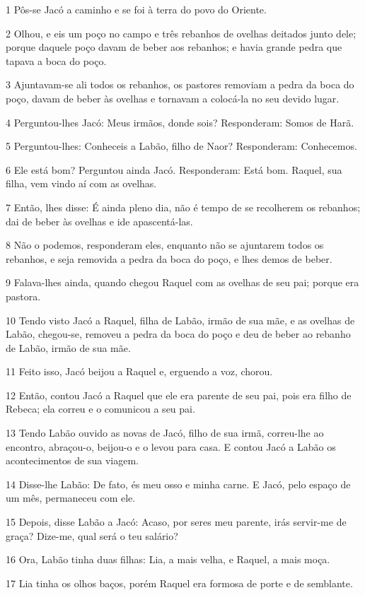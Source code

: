 \par 1 Pôs-se Jacó a caminho e se foi à terra do povo do Oriente.
\par 2 Olhou, e eis um poço no campo e três rebanhos de ovelhas deitados junto dele; porque daquele poço davam de beber aos rebanhos; e havia grande pedra que tapava a boca do poço.
\par 3 Ajuntavam-se ali todos os rebanhos, os pastores removiam a pedra da boca do poço, davam de beber às ovelhas e tornavam a colocá-la no seu devido lugar.
\par 4 Perguntou-lhes Jacó: Meus irmãos, donde sois? Responderam: Somos de Harã.
\par 5 Perguntou-lhes: Conheceis a Labão, filho de Naor? Responderam: Conhecemos.
\par 6 Ele está bom? Perguntou ainda Jacó. Responderam: Está bom. Raquel, sua filha, vem vindo aí com as ovelhas.
\par 7 Então, lhes disse: É ainda pleno dia, não é tempo de se recolherem os rebanhos; dai de beber às ovelhas e ide apascentá-las.
\par 8 Não o podemos, responderam eles, enquanto não se ajuntarem todos os rebanhos, e seja removida a pedra da boca do poço, e lhes demos de beber.
\par 9 Falava-lhes ainda, quando chegou Raquel com as ovelhas de seu pai; porque era pastora.
\par 10 Tendo visto Jacó a Raquel, filha de Labão, irmão de sua mãe, e as ovelhas de Labão, chegou-se, removeu a pedra da boca do poço e deu de beber ao rebanho de Labão, irmão de sua mãe.
\par 11 Feito isso, Jacó beijou a Raquel e, erguendo a voz, chorou.
\par 12 Então, contou Jacó a Raquel que ele era parente de seu pai, pois era filho de Rebeca; ela correu e o comunicou a seu pai.
\par 13 Tendo Labão ouvido as novas de Jacó, filho de sua irmã, correu-lhe ao encontro, abraçou-o, beijou-o e o levou para casa. E contou Jacó a Labão os acontecimentos de sua viagem.
\par 14 Disse-lhe Labão: De fato, és meu osso e minha carne. E Jacó, pelo espaço de um mês, permaneceu com ele.
\par 15 Depois, disse Labão a Jacó: Acaso, por seres meu parente, irás servir-me de graça? Dize-me, qual será o teu salário?
\par 16 Ora, Labão tinha duas filhas: Lia, a mais velha, e Raquel, a mais moça.
\par 17 Lia tinha os olhos baços, porém Raquel era formosa de porte e de semblante.
